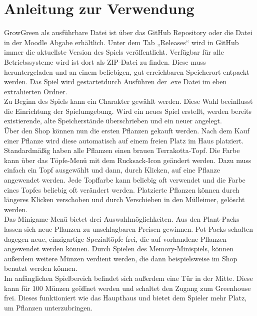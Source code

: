 \chapter{Anleitung zur Verwendung}\label{ch:anleitung}
GrowGreen als ausführbare Datei ist über das GitHub Repository oder die Datei in der Moodle Abgabe erhältlich. 
Unter dem Tab „Releases“ wird in GitHub immer die aktuellste Version des Spiels veröffentlicht. Verfügbar für alle Betriebssysteme wird ist dort als 
ZIP-Datei zu finden. 
Diese muss heruntergeladen und an einem beliebigen, gut erreichbaren Speicherort entpackt werden. 
Das Spiel wird gestartetdurch Ausführen der .exe Datei im eben extrahierten Ordner.\\
\newline
Zu Beginn des Spiels kann ein Charakter gewählt werden. 
Diese Wahl beeinflusst die Einrichtung der Spielumgebung. 
Wird ein neues Spiel erstellt, werden bereits existierende, alte Speicherstände überschrieben und ein neuer angelegt.\\
\newline
Über den Shop können nun die ersten Pflanzen gekauft werden. 
Nach dem Kauf einer Pflanze wird diese automatisch auf einem freien Platz im Haus platziert. 
Standardmäßig haben alle Pflanzen einen brauen Terrakotta-Topf. Die Farbe kann über das Töpfe-Menü mit dem Rucksack-Icon 
geändert werden. 
Dazu muss einfach ein Topf ausgewählt und dann, durch Klicken, auf eine Pflanze angewendet werden. 
Jede Topffarbe kann beliebig oft verwendet und die Farbe eines Topfes beliebig oft verändert werden. 
Platzierte Pflanzen können durch längeres Klicken verschoben und durch Verschieben in den Mülleimer, 
gelöscht werden.\\
\newline
Das Minigame-Menü bietet drei Auswahlmöglichkeiten. 
Aus den Plant-Packs lassen sich neue Pflanzen zu unschlagbaren Preisen gewinnen. 
Pot-Packs schalten dagegen neue, einzigartige Spezialtöpfe frei, die auf vorhandene Pflanzen angewendet werden können. 
Durch Spielen des Memory-Minispiels, können außerdem weitere Münzen verdient werden, die dann beispielsweise im Shop benutzt 
werden können.\\
\newline
Im anfänglichen Spielbereich befindet sich außerdem eine Tür in der Mitte. 
Diese kann für 100 Münzen geöffnet werden und schaltet den Zugang zum Greenhouse frei. 
Dieses funktioniert wie das Haupthaus und bietet dem Spieler mehr Platz, um Pflanzen unterzubringen.\\
